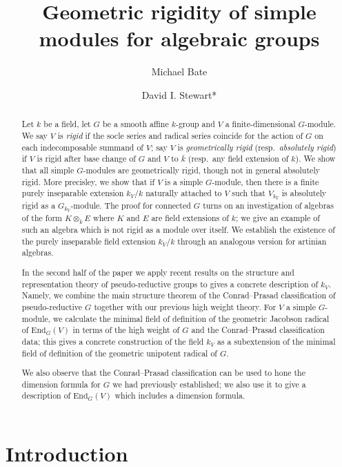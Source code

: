 \documentclass[11pt,reqno]{amsart}
\title{Geometric rigidity of simple modules for algebraic groups}
\author[Bate]{Michael Bate}
\author[Stewart]{David I. Stewart*}
\theoremstyle{definition}
\theoremstyle{remark}
\theoremstyle{definition}
\theoremstyle{plain}
\newcommand{\End}{\mathrm{End}}
\begin{document}
\begin{abstract}
Let $k$ be a field, let $G$ be a smooth affine $k$-group and $V$ a finite-dimensional $G$-module. 
We say $V$ is \emph{rigid} if the socle series and radical series coincide for the action of $G$ on each indecomposable summand of $V$; say $V$ is \emph{geometrically rigid} (resp.~\emph{absolutely rigid}) if $V$ is rigid after base change of $G$ and $V$ to $\bar k$ (resp.~any field extension of $k$).
We show that all simple $G$-modules are geometrically rigid, though not in general absolutely rigid.
More precisley, we show that if $V$ is a simple $G$-module, then there is a finite purely inseparable extension $k_V/k$ naturally attached to $V$ such that
$V_{k_V}$ is absolutely rigid as a $G_{k_V}$-module. 
The proof for connected $G$ turns on an investigation of algebras of the form $K\otimes_k E$ where $K$ and $E$ are field extensions of $k$; 
we give an example of such an algebra which is not rigid as a module over itself. 
We establish the existence of the purely inseparable field extension $k_V/k$ through an analogous version for artinian algebras.

In the second half of the paper we apply recent results on the structure and representation theory of pseudo-reductive groups to gives a concrete description of $k_V$. Namely, we combine  the main structure theorem of the Conrad--Prasad classification of pseudo-reductive $G$ together with our previous high weight theory. For $V$ a simple $G$-module, we calculate the minimal field of definition of the geometric Jacobson radical of $\End_G(V)$ in terms of the high weight of $G$ and the Conrad--Prasad classification data; this gives a concrete construction of the field $k_V$ as a subextension of the minimal field of definition of the geometric unipotent radical of $G$. 

 We also observe that the Conrad--Prasad classification can be used to hone the dimension formula for $G$ we had previously established; we also use it to give a description of $\End_G(V)$ which includes a dimension formula.
\end{abstract}

\maketitle

\section*{Introduction}
\end{document}
